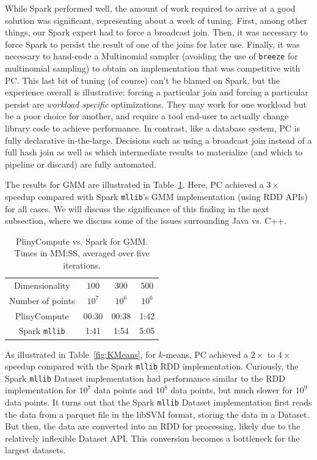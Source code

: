 While Spark performed well, the 
amount of work required to arrive at a good solution 
was significant, representing about a week of tuning.  First, among other things, our Spark expert had to force a 
broadcast join.  Then, it was necessary to force Spark to
persist the result of one of the joins for later use.  Finally, it was necessary to hand-code a 
Multinomial sampler (avoiding the use of \texttt{breeze} for
multinomial sampling) to obtain an implementation that was competitive with PC.
This last bit of tuning (of course) can't be blamed on Spark, but the experience overall is illustrative: forcing 
a particular join and forcing a particular persist are \emph{workload specific} optimizations.  They may work for one
workload but be a poor choice for another, and require a tool end-user to actually change library code to achieve
performance.  In contrast, like a database system, PC is fully declarative in-the-large.
Decisions such as using a broadcast join instead of a full hash
join as well as which intermediate results to materialize (and which to pipeline or discard) are fully automated.

The results for GMM are illustrated in Table~\ref{fig:Gmm}. Here, PC achieved a 
$3\times$ speedup compared with Spark \texttt{mllib}'s GMM implementation
(using RDD APIs) for all cases.  We will discuss the significance of this finding in the next subsection, where we discuss
some of the issues surrounding Java vs. C++.  

\begin{table}[h!]
\begin{center}
\begin{tabular}{|c||c|c|c|}
\hline
Dimensionality & $100$ & $300$ & $500$ \\
Number of points & $10^7$ & $10^6$ & $10^6$ \\
\hline
\hline
PlinyCompute &00:30 & 00:38 & 1:42 \\
Spark \texttt{mllib} &1:41  &1:54 &5:05 \\
\hline
\end{tabular}
\caption{PlinyCompute vs. Spark for GMM. Times in MM:SS, averaged over five iterations.}
\label{fig:Gmm}
\end{center}
\end{table}



As illustrated in Table~\ref{fig:KMeans}, for $k$-means, PC achieved a $2\times$ to
$4\times$ speedup compared with the Spark \texttt{mllib} RDD implementation.
Curiously, the Spark \texttt{mllib} Dataset implementation
had performance similar to the RDD implementation for
$10^7$ data points and $10^8$ data
points, but much slower for $10^9$ data points. It turns out that 
the Spark \texttt{mllib} Dataset implementation first reads the data 
from a parquet file in the libSVM format, storing the data in a Dataset.  But then, the data
are converted into an RDD for processing, likely due to the relatively inflexible Dataset API.
This conversion becomes a bottleneck for the largest datasets.

